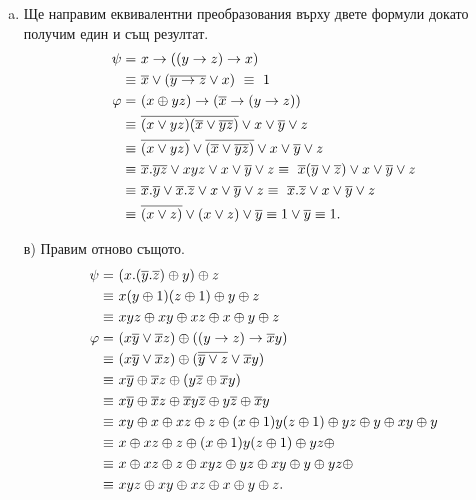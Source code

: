 \begin{solution}
  \begin{enumerate}[a)]
  \item
    Ще направим еквивалентни преобразования върху двете формули докато получим един и същ резултат.
    \begin{align*}
      \psi =\ &  x\rightarrow ((y\rightarrow z)\rightarrow x)\\
      \equiv\ & \overline{x}\vee (\overline{y\rightarrow z}\vee x)\  \equiv\ 1\\
      \varphi =\ & (x\oplus yz)\rightarrow (\overline{x}\rightarrow (y\rightarrow z))\\
      \equiv\ & \overline{(x\vee yz)(\overline{x}\vee\overline{yz})} \vee x\vee \overline{y}\vee z\\
      \equiv\ & \overline{(x\vee yz)}\vee\overline{(\overline{x}\vee\overline{yz})} \vee x\vee \overline{y}\vee z\\
      \equiv\ & \overline{x}.\overline{yz} \vee xyz \vee x\vee \overline{y}\vee z \equiv\ \overline{x}(\overline{y}\vee\overline{z}) \vee x\vee \overline{y}\vee z\\
      \equiv\ & \overline{x}.\overline{y} \vee \overline{x}.\overline{z} \vee x\vee \overline{y}\vee z \equiv\ \overline{x}.\overline{z} \vee x\vee \overline{y}\vee z\\
      \equiv\ & \overline{(x\vee z)} \vee (x\vee z)\vee \overline{y} \equiv 1 \vee \ov{y} \equiv 1.
    \end{align*}
  \item[в)]
    Правим отново същото.
    \begin{align*}
      \psi =\ & (x.(\overline{y}.\overline{z})\oplus y)\oplus z\\
      \equiv\ & x(y\oplus 1)(z\oplus 1) \oplus y \oplus z\\
      \equiv\ & xyz \oplus xy \oplus xz \oplus x \oplus y \oplus z\\
      \varphi =\ & (x\overline{y}\vee \overline{x}z)\oplus ((y\rightarrow z)\rightarrow \overline{x}y)\\
      \equiv\ & (x\overline{y}\vee \overline{x}z) \oplus (\overline{\overline{y}\vee z} \vee \overline{x}y)\\
      \equiv\ & x\overline{y}\oplus \overline{x}z \oplus (y\overline{z} \oplus \overline{x}y) \\
      \equiv\ & x\overline{y}\oplus \overline{x}z\oplus \overline{x}y\overline{z} \oplus y\overline{z} \oplus \overline{x}y \\
      \equiv\ & xy \oplus x \oplus xz \oplus z \oplus (x\oplus 1)y(z\oplus 1) \oplus yz\oplus y \oplus xy \oplus y \\
      \equiv\ & x \oplus xz \oplus z \oplus (x\oplus 1)y(z\oplus 1) \oplus yz\oplus  \\
      \equiv\ & x \oplus xz \oplus z \oplus xyz \oplus yz \oplus xy \oplus y \oplus yz\oplus\\
      \equiv\ & xyz \oplus xy \oplus xz \oplus x \oplus y \oplus z.
     \end{align*}
\end{enumerate}
\end{solution}

